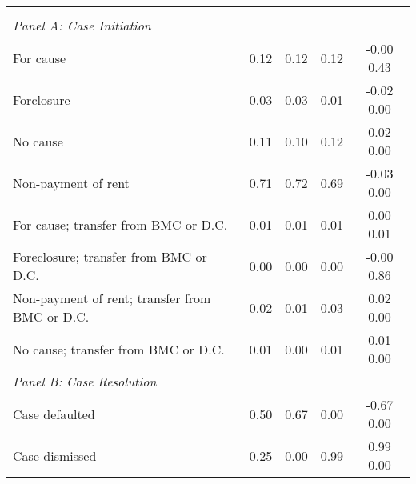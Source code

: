 \begin{table}[htbp]\centering
\def\sym#1{\ifmmode^{#1}\else\(^{#1}\)\fi}

\begin{tabular}{l*{4}{c}}
\toprule
                    &&&&\\
\midrule
\emph{Panel A: Case Initiation}&            &            &            &            \\
\hspace{0.25cm}For cause&      0.12  &      0.12  &      0.12  &  -0.00 0.43\\
\hspace{0.25cm}Forclosure&      0.03  &      0.03  &      0.01  &  -0.02 0.00\\
\hspace{0.25cm}No cause&      0.11  &      0.10  &      0.12  &   0.02 0.00\\
\hspace{0.25cm}Non-payment of rent&      0.71  &      0.72  &      0.69  &  -0.03 0.00\\
\hspace{0.25cm}For cause; transfer from BMC or D.C.&      0.01  &      0.01  &      0.01  &   0.00 0.01\\
\hspace{0.25cm}Foreclosure; transfer from BMC or D.C.&      0.00  &      0.00  &      0.00  &  -0.00 0.86\\
\hspace{0.25cm}Non-payment of rent; transfer from BMC or D.C.&      0.02  &      0.01  &      0.03  &   0.02 0.00\\
\hspace{0.25cm}No cause; transfer from BMC or D.C.&      0.01  &      0.00  &      0.01  &   0.01 0.00\\
\emph{Panel B: Case Resolution}&            &            &            &            \\
\hspace{0.25cm}Case defaulted&      0.50  &      0.67  &      0.00  &  -0.67 0.00\\
\hspace{0.25cm}Case dismissed&      0.25  &      0.00  &      0.99  &   0.99 0.00\\

\end{tabular}
\end{table}
